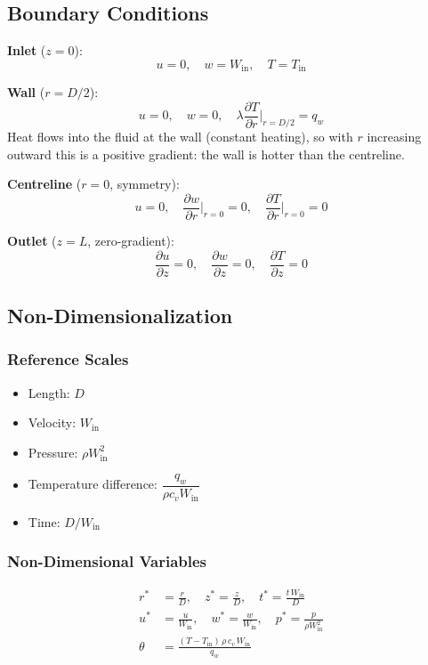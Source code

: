 \documentclass[12pt,a4paper]{article}
\newcommand{\parder}[2]{\frac{\partial #1}{\partial #2}}
\begin{document}
\subsection{Boundary Conditions}

\textbf{Inlet} ($z = 0$):
\begin{equation}
    u = 0, \quad w = W_{\text{in}}, \quad T = T_{\text{in}}
\end{equation}

\textbf{Wall} ($r = D/2$):
\begin{equation}
    u = 0, \quad w = 0, \quad \lambda\parder{T}{r}\bigg|_{r=D/2} = q_w
\end{equation}
Heat flows into the fluid at the wall (constant heating), so with $r$ increasing outward this is a positive gradient: the wall is hotter than the centreline.

\textbf{Centreline} ($r = 0$, symmetry):
\begin{equation}
    u = 0, \quad \parder{w}{r}\bigg|_{r=0} = 0, \quad \parder{T}{r}\bigg|_{r=0} = 0
\end{equation}

\textbf{Outlet} ($z = L$, zero-gradient):
\begin{equation}
    \parder{u}{z} = 0, \quad \parder{w}{z} = 0, \quad \parder{T}{z} = 0
\end{equation}

\newpage

\subsection{Non-Dimensionalization}

\subsubsection{Reference Scales}
\begin{itemize}
    \item Length: $D$
    \item Velocity: $W_{\text{in}}$
    \item Pressure: $\rho W_{\text{in}}^2$
    \item Temperature difference: $\dfrac{q_w}{\rho c_v W_{\text{in}}}$
    \item Time: $D / W_{\text{in}}$
\end{itemize}

\subsubsection{Non-Dimensional Variables}
\begin{align}
    r^* &= \frac{r}{D}, \quad z^* = \frac{z}{D}, \quad t^* = \frac{t\,W_{\text{in}}}{D} \\[6pt]
    u^* &= \frac{u}{W_{\text{in}}}, \quad w^* = \frac{w}{W_{\text{in}}}, \quad
    p^* = \frac{p}{\rho W_{\text{in}}^2} \\[6pt]
    \theta &= \frac{(T - T_{\text{in}})\,\rho\, c_v\, W_{\text{in}}}{q_w}
\end{align}
\end{document}
